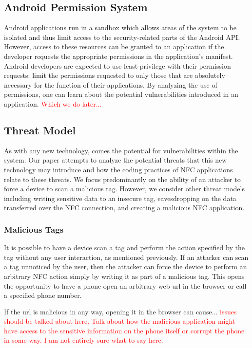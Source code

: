 \documentclass[12pt]{article}
\newcommand\TODO[1]{\textcolor{red}{#1}}
\begin{document}
\subsection{Android Permission System}
Android applications run in a sandbox which allows areas of the system to be isolated and thus limit access to the security-related parts of the Android API. However, access to these resources can be granted to an application if the developer requests the appropriate permissions in the application's manifest. Android developers are expected to use least-privilege with their permission requests: limit the permissions requested to only those that are absolutely necessary for the function of their applications. By analyzing the use of permissions, one can learn about the potential vulnerabilities introduced in an application. \TODO{Which we do later...}

\subsection{Threat Model}
As with any new technology, comes the potential for vulnerabilities within the system. Our paper attempts to analyze the potential threats that this new technology may introduce and how the coding practices of NFC applications relate to these threats. We focus predominantly on the ability of an attacker to force a device to scan a malicious tag. However, we consider other threat models including writing sensitive data to an insecure tag, eavesdropping on the data transferred over the NFC connection, and creating a malicious NFC application. 

\subsubsection{Malicious Tags}
It is possible to have a device scan a tag and perform the action specified by the tag without any user interaction, as mentioned previously. If an attacker can scan a tag unnoticed by the user, then the attacker can force the device to perform an arbitrary NFC action simply by writing it as part of a malicious tag. This opens the opportunity to have a phone open an arbitrary web url in the browser or call a specified phone number. 

If the url is malicious in any way, opening it in the browser can cause... \TODO{issues should be talked about here. Talk about how the malicious application might have access to the sensitive information on the phone itself or corrupt the phone in some way. I am not entirely sure what to say here.} 
\end{document}
